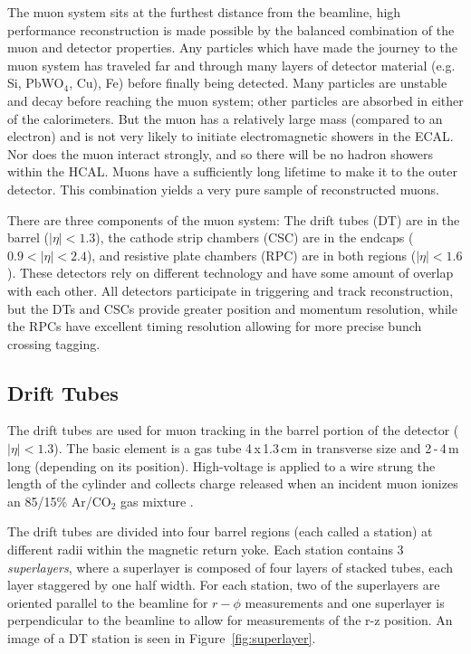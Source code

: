 The muon system sits at the furthest distance from the beamline, high performance reconstruction is made possible by the balanced combination of the muon and detector properties. Any particles which have made the journey to the muon system has traveled far and through many layers of detector material (e.g. Si, PbWO$_{4}$, Cu), Fe) before finally being detected. Many particles are unstable and decay before reaching the muon system; other particles are absorbed in either of the calorimeters. But the muon has a relatively large mass (compared to an electron) and is not very likely to initiate electromagnetic showers in the ECAL. Nor does the muon interact strongly, and so there will be no hadron showers within the HCAL. Muons have a sufficiently long lifetime to make it to the outer detector. This combination yields a very pure sample of reconstructed muons.

There are three components of the muon system: The drift tubes (DT) are in the barrel ($|\eta|<1.3$), the cathode strip chambers (CSC) are in the endcaps ($0.9<|\eta|<2.4$), and resistive plate chambers (RPC) are in both regions ($|\eta| < 1.6$). These detectors rely on different technology and have some amount of overlap with each other. All detectors participate in triggering and track reconstruction, but the DTs and CSCs provide greater position and momentum resolution, while the RPCs have excellent timing resolution allowing for more precise bunch crossing tagging.

\subsection{Drift Tubes}

The drift tubes are used for muon tracking in the barrel portion of the detector ($|\eta|<1.3$). The basic element is a gas tube 4$\,$x$\,$1.3$\,$cm in transverse size and 2$\,$-$\,$4$\,$m long (depending on its position). High-voltage is applied to a wire strung the length of the cylinder and collects charge released when an incident muon ionizes an 85/15\% Ar/CO$_{2}$ gas mixture \cite{dtperformance}.

The drift tubes are divided into four barrel regions (each called a station) at different radii within the magnetic return yoke. Each station contains 3 \textit{superlayers}, where a superlayer is composed of four layers of stacked tubes, each layer staggered by one half width. For each station, two of the superlayers are oriented parallel to the beamline for $r-\phi$ measurements and one superlayer is perpendicular to the beamline to allow for measurements of the r-z position. An image of a DT station is seen in Figure~\ref{fig:superlayer}.

